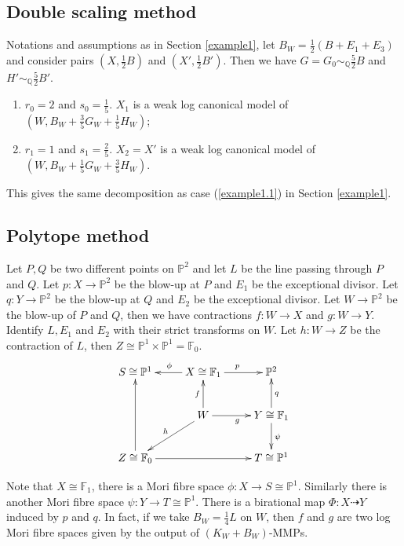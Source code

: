 \documentclass[11pt]{amsart}
\begin{document}
\subsection{Double scaling method}
Notations and assumptions as in Section \ref{example1}, let $B_{W}=\frac{1}{2}(B+E_{1}+E_{3})$ and consider pairs $(X,\frac{1}{2}B)$ and $(X',\frac{1}{2}B')$. Then we have $G=G_{0}\sim_{\mathbb{Q}}\frac{5}{2}B$ and $H'\sim_{\mathbb{Q}}\frac{5}{2}B'$.

\begin{enumerate}
  \item $r_{0}=2$ and $s_{0}=\frac{1}{5}$. $X_{1}$ is a weak log canonical model of $(W,B_{W}+\frac{3}{5}G_{W}+\frac{1}{5}H_{W})$;
  \item  $r_{1}=1$ and $s_{1}=\frac{2}{5}$. $X_{2}= X'$ is a weak log canonical model of $(W,B_{W}+\frac{1}{5}G_{W}+\frac{3}{5}H_{W})$.
\end{enumerate} 

This gives the same decomposition as case (\ref{example1.1}) in  Section \ref{example1}.

\subsection{Polytope method}
Let  $P,Q$ be two different points on $\mathbb{P}^{2}$ and let $L$ be the line passing through $P$ and $Q$. Let $p:X\to \mathbb{P}^{2}$ be the blow-up at $P$ and $E_{1}$ be the exceptional divisor. Let $q:Y\to \mathbb{P}^{2}$ be the blow-up at $Q$ and $E_{2}$ be the exceptional divisor. Let $W\to \mathbb{P}^{2}$ be the blow-up of $P$ and $Q$, then we have contractions $f:W\to X$ and $g:W\to Y$. Identify $L,E_{1}$ and $E_{2}$ with their strict transforms on  $W$. Let $h:W\to Z$ be the contraction of $L$, then $Z\cong \mathbb{P}^{1} \times \mathbb{P}^{1}=\mathbb{F}_{0}$.
\[
  \xymatrix{
    S\cong \mathbb{P}^{1}&X\cong \mathbb{F}_{1}\ar[l]_{\phi}\ar[r]^{p} & \mathbb{P}^{2} \\
                         &W\ar[u]^{f}\ar[r]_{g}\ar[ld]_{h} & Y\cong \mathbb{F}_{1}\ar[u]_{q}\ar[d]^{\psi}\\
    Z\cong \mathbb{F}_{0}\ar[uu]\ar[rr]&&T\cong \mathbb{P}^{1}
  }
\]

Note that $X\cong \mathbb{F}_{1}$, there is a  Mori fibre space $\phi:X\to S \cong \mathbb{P}^{1}$. Similarly there is another Mori fibre space $\psi:Y\to T\cong \mathbb{P}^{1}$. There is a birational map $\Phi:X\dashrightarrow  Y$ induced by $p$ and $q$. In fact, if we take $B_{W}=\frac{1}{4}L$ on $W$, then $f$ and $g$ are two log Mori fibre spaces given by the output of $(K_{W}+B_{W})$-MMPs.
\end{document}
